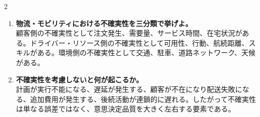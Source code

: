 \begin{multicols}{2}
\begin{enumerate}
\item \textbf{物流・モビリティにおける不確実性を三分類で挙げよ。}\\
顧客側の不確実性として注文発生、需要量、サービス時間、在宅状況がある。ドライバー・リソース側の不確実性として可用性、行動、航続距離、スキルがある。環境側の不確実性として交通、駐車、道路ネットワーク、天候がある。
\item \textbf{不確実性を考慮しないと何が起こるか。}\\
計画が実行不能になる、遅延が発生する、顧客が不在になり配送失敗になる、追加費用が発生する、後続活動が連鎖的に遅れる。したがって不確実性は単なる誤差ではなく、意思決定品質を大きく左右する要素である。
\end{enumerate}

\end{multicols}

\clearpage



\vspace{1.5mm}

